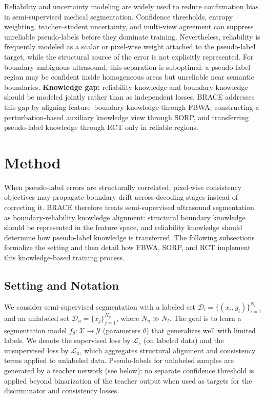\documentclass[a4paper,fleqn]{cas-dc}
\begin{document}
Reliability and uncertainty modeling are widely used to reduce confirmation bias in semi-supervised medical segmentation. Confidence thresholds, entropy weighting, teacher--student uncertainty, and multi-view agreement can suppress unreliable pseudo-labels before they dominate training. Nevertheless, reliability is frequently modeled as a scalar or pixel-wise weight attached to the pseudo-label target, while the structural source of the error is not explicitly represented. For boundary-ambiguous ultrasound, this separation is suboptimal: a pseudo-label region may be confident inside homogeneous areas but unreliable near semantic boundaries. \textbf{Knowledge gap:} reliability knowledge and boundary knowledge should be modeled jointly rather than as independent losses. BRACE addresses this gap by aligning feature--boundary knowledge through FBWA, constructing a perturbation-based auxiliary knowledge view through SORP, and transferring pseudo-label knowledge through RCT only in reliable regions.


\section{Method}

When pseudo-label errors are structurally correlated, pixel-wise consistency objectives may propagate boundary drift across decoding stages instead of correcting it. BRACE therefore treats semi-supervised ultrasound segmentation as boundary-reliability knowledge alignment: structural boundary knowledge should be represented in the feature space, and reliability knowledge should determine how pseudo-label knowledge is transferred. The following subsections formalize the setting and then detail how FBWA, SORP, and RCT implement this knowledge-based training process.

\subsection{Setting and Notation}

We consider semi-supervised segmentation with a labeled set $\mathcal{D}_l = \{(x_i, y_i)\}_{i=1}^{N_l}$ and an unlabeled set $\mathcal{D}_u = \{x_j\}_{j=1}^{N_u}$, where $N_u \gg N_l$. The goal is to learn a segmentation model $f_\theta: \mathcal{X} \rightarrow \mathcal{Y}$ (parameters $\theta$) that generalizes well with limited labels. We denote the supervised loss by $\mathcal{L}_s$ (on labeled data) and the unsupervised loss by $\mathcal{L}_u$, which aggregates structural alignment and consistency terms applied to unlabeled data. Pseudo-labels for unlabeled samples are generated by a teacher network (see below); no separate confidence threshold is applied beyond binarization of the teacher output when used as targets for the discriminator and consistency losses.
\end{document}
